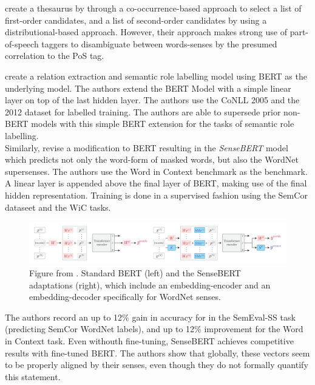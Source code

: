 \documentclass[a4paper,12pt,twoside,openright]{report}
\begin{document}
\cite{liebeskind19} create a thesaurus by through a co-occurrence-based approach to select a list of first-order candidates, and a list of second-order candidates by using a  distributional-based approach.
However, their approach makes strong use of part-of-speech taggers to disambiguate between words-senses by the presumed correlation to the PoS tag.

\cite{shi19} create a relation extraction and semantic role labelling model using BERT as the underlying model.
The authors extend the BERT Model with a simple linear layer on top of the last hidden layer. 
The authors use the CoNLL 2005 \cite{carreras04} and the 2012  dataset \cite{pradhan13} for labelled training.
The authors are able to supersede prior non-BERT models with this simple BERT extension for the tasks of semantic role labelling. \\

Similarly, \cite{levine19} revise a modification to BERT resulting in the \textit{SenseBERT} model which predicts not only the word-form of masked words, but also the WordNet supersenses.
The authors use the Word in Context benchmark as the benchmark.
A linear layer is appended above the final layer of BERT, making use of the final hidden representation.
Training is done in a supervised fashion using the SemCor dataseet and the WiC tasks.

\begin{figure}
	\center
  \includegraphics[width=\linewidth]{./assets/relatedwork/sensebert.png}
  \caption{Figure from \cite{levine19}. Standard BERT (left) and the SenseBERT adaptations (right), which include an embedding-encoder and an embedding-decoder specifically for WordNet senses.}
  \label{fig:embeddings_by_language}
\end{figure}

The authors record an up to 12\% gain in accuracy for in the SemEval-SS task (predicting SemCor WordNet labels), and up to 12\% improvement for the Word in Context task.
Even withouth fine-tuning, SenseBERT achieves competitive results with fine-tuned BERT.
The authors show that globally, these vectors seem to be properly aligned by their senses, even though they do not formally quantify this statement. \\
\end{document}
